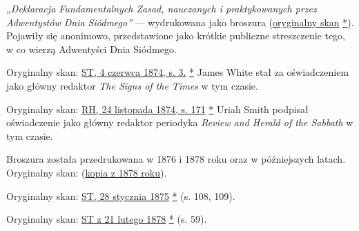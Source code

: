 
\textit{„Deklaracja Fundamentalnych Zasad, nauczanych i praktykowanych przez Adwentystów Dnia Siódmego”} — wydrukowana jako broszura (\href{https://adventistdigitallibrary.org/islandora/object/adl:366607?link_only=true}{oryginalny skan} \href{https://forgotten-pillar.s3.us-east-2.amazonaws.com/A+declaration+of+the+fundamental+principles+taught+and+practiced+by+the+Seventh-day+Adventists++.pdf}{*}). Pojawiły się anonimowo, przedstawione jako krótkie publiczne streszczenie tego, w co wierzą Adwentyści Dnia Siódmego.


Oryginalny skan: \href{https://adventistdigitallibrary.org/adl-364148/signs-times-june-4-1874}{ST, 4 czerwca 1874, s. 3.} \href{https://forgotten-pillar.s3.us-east-2.amazonaws.com/Signs+of+the+Times+_+June+4%2C+1874++.pdf}{*} James White stał za oświadczeniem jako główny redaktor \textit{The Signs of the Times} w tym czasie.


Oryginalny skan: \href{https://documents.adventistarchives.org/Periodicals/RH/RH18741124-V44-22.pdf}{RH, 24 listopada 1874, s. 171} \href{https://forgotten-pillar.s3.us-east-2.amazonaws.com/RH18741124-V44-22.pdf}{*} Uriah Smith podpisał oświadczenie jako główny redaktor periodyka \textit{Review and Herald of the Sabbath} w tym czasie.


Broszura została przedrukowana w 1876 i 1878 roku oraz w późniejszych latach. \\
Oryginalny skan: (\href{https://adventistdigitallibrary.org/islandora/object/adl%3A22250872?solr_nav%5Bid%5D=a09d3902c2540c98eb7f&solr_nav%5Bpage%5D=56&solr_nav%5Boffset%5D=3}{kopia z 1878 roku}).


Oryginalny skan: \href{https://documents.adventistarchives.org/Periodicals/ST/ST18750128-V01-14.pdf#search=ST18750128}{ST, 28 stycznia 1875} \href{https://forgotten-pillar.s3.us-east-2.amazonaws.com/ST18750128-V01-14.pdf}{*} (s. 108, 109).


Oryginalny skan: \href{https://documents.adventistarchives.org/Periodicals/ST/ST18780221-V04-08.pdf#search=%22As%20already%20stated%2C%20S%2E%20D%2E%20Adventists%22}{ST z 21 lutego 1878} \href{https://forgotten-pillar.s3.us-east-2.amazonaws.com/ST18780221-V04-08.pdf}{*} (s. 59).

